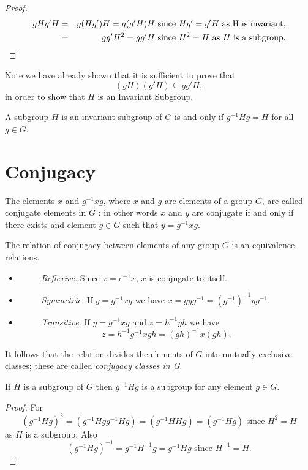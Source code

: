 \begin{proof}
\begin{eqnarray*}
 gH g'H &=& g (Hg') H = g(g'H)H \mbox{ since } Hg' = g'H  \mbox{ as H is invariant,}\cr
 &=& gg'H^2 = gg'H \mbox{ since } H^2 = H \mbox{ as } H \mbox{ is a subgroup.}
\end{eqnarray*}
\end{proof}
Note we have already shown that it is sufficient to prove that \[ (gH)(g'H) \subseteq gg'H,\] in order to show that $H$ is an Invariant Subgroup. 

\begin{theorem}
A subgroup $H$ is an invariant subgroup of $G$ is and only if $g^{-1}Hg = H$ for all $g\in G$. 
\end{theorem}

\section{Conjugacy}
\begin{definition}
The elements $x$ and $g^{-1} x g$, where $x$ and $g$ are elements of a group $G$, are called conjugate elements in $G$ : in other words $x$ and $y$ are conjugate if and only if there exists
and element $g \in G$ such that $y = g^{-1} x g$.
\end{definition}

\begin{theorem}
The relation of conjugacy between elements of any group $G$ is an equivalence relations. 
\begin{itemize}
\item[]{\it ~~~~~Reflexive.} Since $x = e^{-1} x$, $x$ is conjugate to itself.
\item[]{\it ~~~~~Symmetric.} If $ y = g^{-1} x g$ we have $x = g y g^{-1} = (g^{-1})^{-1} y g^{-1}$. 
\item[]{\it ~~~~~Transitive.}  If $  y = g^{-1} x g$ and  $z = h^{-1} y h$ we have \[ z = h^{-1}g^{-1} x g h = (gh)^{-1} x (gh).\] 
\end{itemize}
\end{theorem}
It follows that the relation divides the elements of $G$ into mutually exclusive classes; these are called {\it conjugacy classes in G}.

\begin{theorem}
If $H$ is a subgroup of $G$ then $g^{-1} H g$ is a subgroup for any element $g\in G$. 
\end{theorem}
\begin{proof}
For \[(g^{-1} H g)^2 = (g^{-1} H g g^{-1} H g) = (g^{-1} H H g) = (g^{-1} H g) \mbox{   since }  H^2 = H\] as $H$ is a subgroup. Also
\[  (g^{-1} H g)^{-1} = g^{-1} H^{-1} g = g^{-1} H g  \mbox{   since } H^{-1} = H.\]  
\end{proof}

